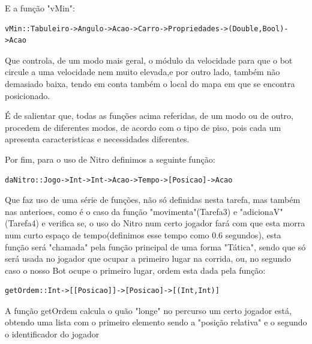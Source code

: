 \documentclass[a4paper]{report} %
\begin{document}
E a função "vMin":
\begin{verbatim}
vMin::Tabuleiro->Angulo->Acao->Carro->Propriedades->(Double,Bool)->Acao
\end{verbatim}
Que controla, de um modo mais geral, o módulo da velocidade para que o bot circule a uma velocidade nem muito elevada,e por outro lado, também não demasiado baixa, tendo em conta também o local do mapa em que se encontra posicionado.

É de salientar que, todas as funções acima referidas, de um modo ou de outro, procedem de diferentes modos, de acordo com o tipo de piso, pois cada um apresenta caracteristicas e necessidades diferentes.

Por fim, para o uso de Nitro definimos a seguinte função:
\begin{verbatim}
daNitro::Jogo->Int->Int->Acao->Tempo->[Posicao]->Acao
\end{verbatim}

Que faz uso de uma série de funções, não só definidas nesta tarefa, mas também nas anterioes, como é o caso da função "movimenta"(Tarefa3) e "adicionaV"(Tarefa4) e verifica se, o uso do Nitro num certo jogador fará com que esta morra num curto espaço de tempo(definimos esse tempo como 0.6 segundos), esta função será "chamada" pela função principal de uma forma "Tática", sendo que só será usada no jogador que ocupar a primeiro lugar na corrida, ou, no segundo caso o nosso Bot ocupe o primeiro lugar, ordem esta dada pela função:
\begin{verbatim}
getOrdem::Int->[[Posicao]]->[Posicao]->[(Int,Int)]
\end{verbatim}
A função getOrdem calcula o quão "longe" no percurso um certo jogador está, obtendo uma lista com o primeiro elemento sendo a "posição relativa" e o segundo o identificador do jogador
\end{document}
